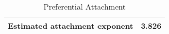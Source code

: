 \begin{table}[!h]

\caption{Preferential Attachment}
\centering
\begin{tabular}[t]{lr}
\toprule
Estimated attachment exponent & 3.826\\
\bottomrule
\end{tabular}
\end{table}
